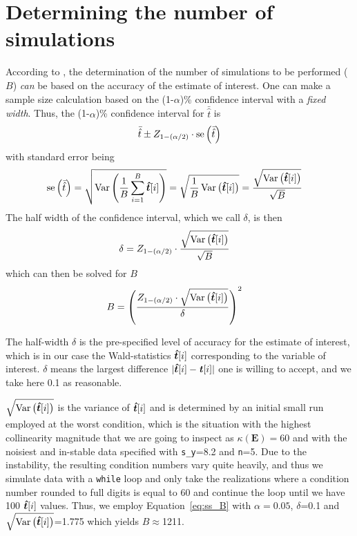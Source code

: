 \documentclass[11pt,a4paper,twoside]{book}\usepackage[]{graphicx}\usepackage[]{xcolor}
\begin{document}
\section{Determining the number of simulations}\label{sec:B}

According to \cite{Burton2006}, the determination of the number of simulations to be performed ($B$) \textit{can} be based on the accuracy of the estimate of interest. One can make a sample size calculation based on the (1-$\alpha$)\% confidence interval with a \textit{fixed width}. Thus, the (1-$\alpha$)\% confidence interval for $\bar{\hat{t}}$ is 
\begin{align*}
\bar{\hat{t}}\pm Z_{1-(\alpha/2)}\cdot \operatorname{se}\left(\bar{\hat{t}}\right)
\end{align*}
with standard error being
\begin{align*}
\operatorname{se}\left(\bar{\hat{t}}\right) &=\sqrt{\operatorname{Var}\left(\frac{1}{B}\sum_{i=1}^{B}{\boldsymbol{\hat{t}}}[i]\right)}=\sqrt{\frac{1}{B} \operatorname{Var}\left({\boldsymbol{\hat{t}}}[i]\right) }=\frac{\sqrt{\operatorname{Var}\left({\boldsymbol{\hat{t}}}[i]\right) }
}{\sqrt{B}}
\end{align*}
The half width of the confidence interval, which we call $\delta$, is then
\begin{align*}
\delta&=Z_{1-(\alpha/2)}\cdot \frac{\sqrt{\operatorname{Var}\left({\boldsymbol{\hat{t}}}[i]\right) }
}{\sqrt{B}}
\end{align*}
which can then be solved for $B$
\begin{align}
B&=\left(\frac{Z_{1-(\alpha/2)}\cdot \sqrt{\operatorname{Var}\left({\boldsymbol{\hat{t}}}[i]\right) }
}{\delta}\right)^2
\label{eq:ss_B}\end{align}



The half-width $\delta$ is the pre-specified level of accuracy for the estimate of interest, which is in our case the Wald-statistics ${\boldsymbol{\hat{t}}}[i]$ corresponding to the variable of interest. $\delta$ means the largest difference $|{\boldsymbol{\hat{t}}}[i]-{\textbf{\textit{t}}}[i]|$ one is willing to accept, and we take here 0.1 as reasonable.

$\sqrt{\operatorname{Var}\left({\boldsymbol{\hat{t}}}[i]\right) }$ is the variance of ${\boldsymbol{\hat{t}}}[i]$ and is determined by an initial small run employed at the worst condition, which is the situation with the highest collinearity magnitude that we are going to inspect as $\kappa\left(\boldsymbol{E}\right)=60$ and with the noisiest and in-stable data specified with \texttt{s\_y}=8.2 and \texttt{n}=5.
Due to the instability, the resulting condition numbers vary quite heavily, and thus we simulate data with a \texttt{while} loop and only take the realizations where a condition number rounded to full digits is equal to 60 and continue the loop until we have 100 ${\boldsymbol{\hat{t}}}[i]$ values.
Thus, we employ Equation~\eqref{eq:ss_B} with $\alpha=0.05$, $\delta$=0.1 and $\sqrt{\operatorname{Var}\left({\boldsymbol{\hat{t}}}[i]\right) }$=1.775 which yields $B\approx$1211.
\end{document}
